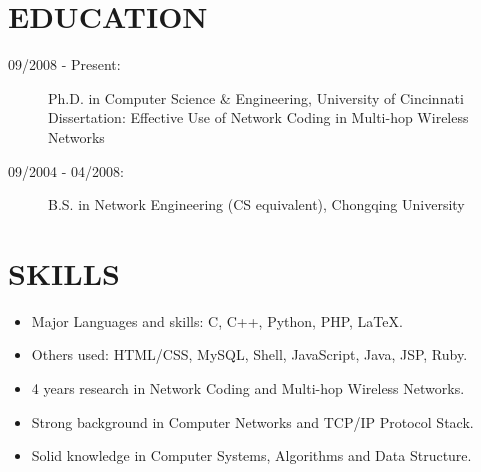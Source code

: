 \documentclass[line]{res}
\begin{document}
\address{226 Ludlow Ave Apt 11 \\ Cincinnati, OH 45220 \\ 513-679-0772}
\address{Email: \href{mailto:yang@yangchi.me}{yang@yangchi.me} \\ Github: \url{https://github.com/yangchi} }

\begin{resume}
	\section{EDUCATION}
	\begin{description}
		\item[09/2008 - Present:] Ph.D. in Computer Science \& Engineering, University of Cincinnati\\
			Dissertation: Effective Use of Network Coding in Multi-hop Wireless Networks
		\item[09/2004 - 04/2008:] B.S. in Network Engineering (CS equivalent), Chongqing University
	\end{description}
	
	\section{SKILLS}
	\begin{itemize}
		\item Major Languages and skills: C, C++, Python, PHP, LaTeX.
		\item Others used: HTML/CSS, MySQL, Shell, JavaScript, Java, JSP, Ruby.
		\item 4 years research in Network Coding and Multi-hop Wireless Networks.
		\item Strong background in Computer Networks and TCP/IP Protocol Stack.
		\item Solid knowledge in Computer Systems, Algorithms and Data Structure.
	\end{itemize}


\end{resume}
\end{document}
